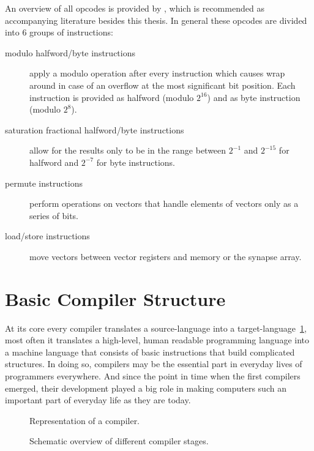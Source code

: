 An overview of all opcodes is provided by \cite{nuxmanual}, which is recommended as accompanying literature besides this thesis.
In general these opcodes are divided into 6 groups of instructions:
\begin{description}
    \item[modulo halfword/byte instructions] apply a modulo operation after every instruction which causes wrap around in case of an overflow at the most significant bit position.
        Each instruction is provided as halfword (modulo $2^{16}$) and as byte instruction (modulo $2^{8}$).
    \item[saturation fractional halfword/byte instructions] allow for the results only to be in the range between $2^{-1}$ and $2^{-15}$ for halfword and $2^{-7}$ for byte instructions.
    \item[permute instructions] perform operations on vectors that handle elements of vectors only as a series of bits.
    \item[load/store instructions] move vectors between vector registers and memory or the synapse array.
\end{description}



\section{Basic Compiler Structure}
\label{section:compiler}
At its core every compiler translates a source-language into a target-language~\ref{fig:compiler}, most often it translates a high-level, human readable programming language into a machine language that consists of basic instructions that build complicated structures.
In doing so, compilers may be the essential part in everyday lives of programmers everywhere.
And since the point in time when the first compilers emerged, their development played a big role in making computers such an important part of everyday life as they are today.

\begin{figure}
    
    \caption{\label{fig:compiler} Representation of a compiler.}
\end{figure}

\begin{figure}
    
    \caption{\label{fig:cmpstruct} Schematic overview of different compiler stages.}
\end{figure}

